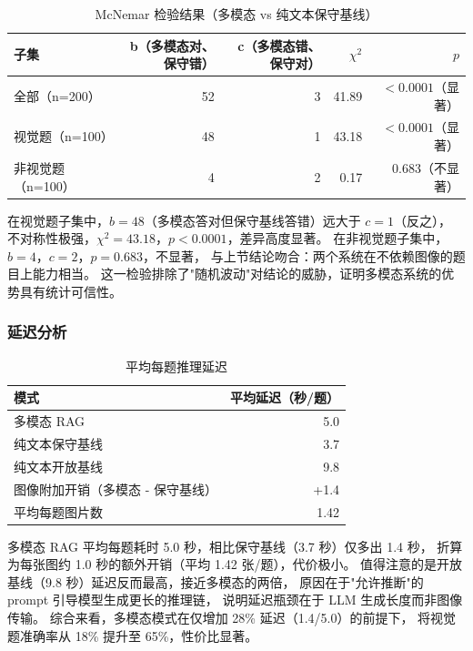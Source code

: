 ﻿\documentclass[UTF8, heading=true]{ctexart}
\begin{document}
\begin{table}[H]
\centering
\caption{McNemar 检验结果（多模态 vs 纯文本保守基线）}
\begin{tabular}{lrrrr}
\toprule
\textbf{子集} & \textbf{b（多模态对、保守错）} & \textbf{c（多模态错、保守对）} & \textbf{$\chi^2$} & \textbf{$p$} \\
\midrule
全部（n=200）& 52 & 3 & 41.89 & $<0.0001$（显著）\\
视觉题（n=100）& 48 & 1 & 43.18 & $<0.0001$（显著）\\
非视觉题（n=100）& 4 & 2 & 0.17 & 0.683（不显著）\\
\bottomrule
\end{tabular}
\label{tab:mcnemar}
\end{table}

在视觉题子集中，$b=48$（多模态答对但保守基线答错）远大于 $c=1$（反之），
不对称性极强，$\chi^2=43.18$，$p<0.0001$，差异高度显著。
在非视觉题子集中，$b=4$，$c=2$，$p=0.683$，不显著，
与上节结论吻合：两个系统在不依赖图像的题目上能力相当。
这一检验排除了"随机波动"对结论的威胁，证明多模态系统的优势具有统计可信性。

\subsubsection{延迟分析}

\begin{table}[H]
\centering
\caption{平均每题推理延迟}
\begin{tabular}{lr}
\toprule
\textbf{模式} & \textbf{平均延迟（秒/题）} \\
\midrule
多模态 RAG & 5.0 \\
纯文本保守基线 & 3.7 \\
纯文本开放基线 & 9.8 \\
图像附加开销（多模态 - 保守基线）& +1.4 \\
\midrule
平均每题图片数 & 1.42 \\
\bottomrule
\end{tabular}
\label{tab:latency}
\end{table}

多模态 RAG 平均每题耗时 5.0 秒，相比保守基线（3.7 秒）仅多出 1.4 秒，
折算为每张图约 1.0 秒的额外开销（平均 1.42 张/题），代价极小。
值得注意的是开放基线（9.8 秒）延迟反而最高，接近多模态的两倍，
原因在于"允许推断"的 prompt 引导模型生成更长的推理链，
说明延迟瓶颈在于 LLM 生成长度而非图像传输。
综合来看，多模态模式在仅增加 28\% 延迟（1.4/5.0）的前提下，
将视觉题准确率从 18\% 提升至 65\%，性价比显著。
\end{document}
